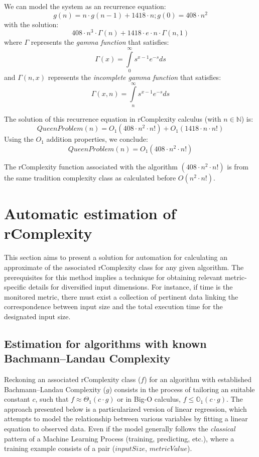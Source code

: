 We can model the system as an recurrence equation:
\[ g(n) = n \cdot  g(n-1) + 1418 \cdot  n; g(0) = 408 \cdot  n^{2} \]
with the solution:
\[ 408 \cdot n^{3} \cdot \Gamma(n) + 1418 \cdot e \cdot  n \cdot \Gamma(n, 1)\]
where $\Gamma$ represents the \textit{gamma function} that satisfies: \[ \Gamma \left( x \right) = \int\limits_0^\infty {s^{x - 1} e^{ - s} ds} \] and $ \Gamma(n,x)$ represents the \textit{incomplete gamma function} that satisfies: \[ \Gamma \left(x, n \right) = \int\limits_n^\infty {s^{x - 1} e^{ - s} ds}\]

The solution of this recurrence equation in rComplexity calculus (with $n \in \mathbb{N}$) is:
\[ QueenProblem(n) = O_{1}(408 \cdot n^{2} \cdot n!) + O_{1}(1418 \cdot n \cdot n!) \]
Using the $O_{1}$ addition properties, we conclude:
\[ QueenProblem(n) = O_{1}(408 \cdot n^{2} \cdot n!) \]

\begin{remark}
    The rComplexity function associated with the algorithm $(408 \cdot n^{2} \cdot n!)$ is from the same tradition complexity class as calculated before $ O(n^2\cdot n!)$.
\end{remark}


\section{Automatic estimation of rComplexity}
This section aims to present a solution for automation for calculating an approximate of the associated rComplexity class for any given algorithm. The prerequisites for this method implies a technique for obtaining relevant metric-specific details for diversified input dimensions. For instance, if time is the monitored metric, there must exist a collection of pertinent data linking the correspondence between input size and the total execution time for the designated input size.

\subsection{Estimation for algorithms with known Bachmann–Landau Complexity}
Reckoning an associated rComplexity class ($f$) for an algorithm with established Bachmann–Landau Complexity ($g$) consists in the process of tailoring an suitable constant $c$, such that $f \approx \Theta_{1}(c \cdot g)$ or in Big-O calculus, $f \leq  \mathbb{O}_{1} (c \cdot g)$. The approach presented below is a particularized version of linear regression, which attempts to model the relationship between various variables by fitting a linear equation to observed data. Even if the model generally follows the \textit{classical} pattern of a Machine Learning Process (training, predicting, etc.), where a training example consists of a pair ($inputSize$, $metricValue$).

